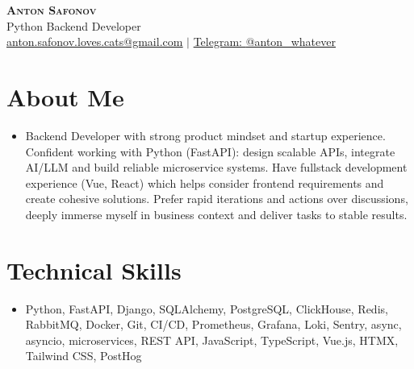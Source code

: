 \documentclass[letterpaper,11pt]{article}
\begin{document}
\vspace*{-50pt}

\begin{center}
    \textbf{\huge \scshape Anton Safonov} \\ \vspace{-1pt}
    \large Python Backend Developer \\ \vspace{-1pt}
    \small \href{mailto:anton.safonov.loves.cats@gmail.com}{\underline{anton.safonov.loves.cats@gmail.com}} $|$ 
    \href{https://t.me/anton_whatever}{Telegram: \underline{@anton\_whatever}} 
\end{center}

\section{About Me}
\small\begin{itemize}[leftmargin=0.15in, label={}]
\item{Backend Developer with strong product mindset and startup experience. Confident working with Python (FastAPI): design scalable APIs, integrate AI/LLM and build reliable microservice systems. Have fullstack development experience (Vue, React) which helps consider frontend requirements and create cohesive solutions. Prefer rapid iterations and actions over discussions, deeply immerse myself in business context and deliver tasks to stable results.}
\end{itemize}
\section{Technical Skills}
 \begin{itemize}[leftmargin=0.15in, label={}]
    \item Python, FastAPI, Django, SQLAlchemy, PostgreSQL, ClickHouse, Redis, RabbitMQ, Docker, Git, CI/CD, Prometheus, Grafana, Loki, Sentry, async, asyncio, microservices, REST API, JavaScript, TypeScript, Vue.js, HTMX, Tailwind CSS, PostHog
 \end{itemize}
\end{document}
